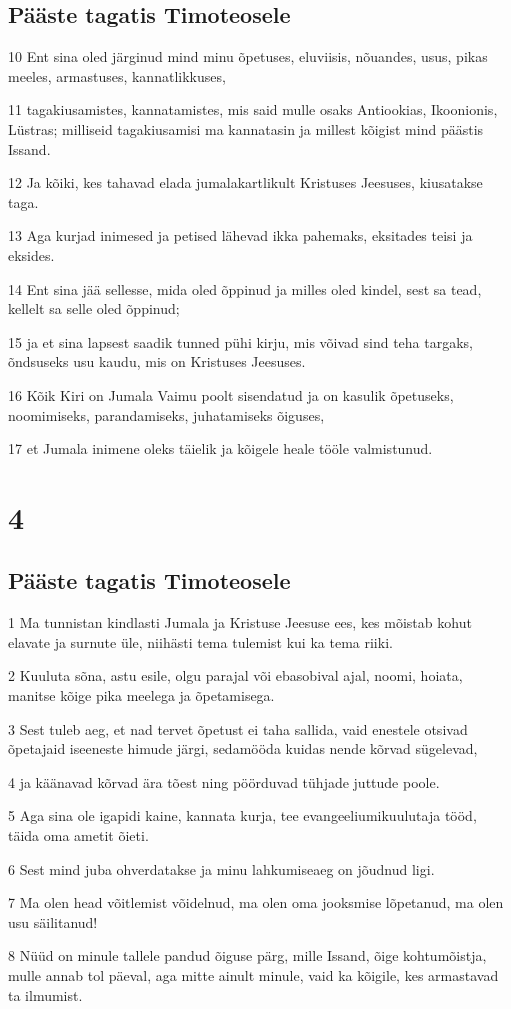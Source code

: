\section*{Pääste tagatis Timoteosele}

\par 10 Ent sina oled järginud mind minu õpetuses, eluviisis, nõuandes, usus, pikas meeles, armastuses, kannatlikkuses,
\par 11 tagakiusamistes, kannatamistes, mis said mulle osaks Antiookias, Ikoonionis, Lüstras; milliseid tagakiusamisi ma kannatasin ja millest kõigist mind päästis Issand.
\par 12 Ja kõiki, kes tahavad elada jumalakartlikult Kristuses Jeesuses, kiusatakse taga.
\par 13 Aga kurjad inimesed ja petised lähevad ikka pahemaks, eksitades teisi ja eksides.
\par 14 Ent sina jää sellesse, mida oled õppinud ja milles oled kindel, sest sa tead, kellelt sa selle oled õppinud;
\par 15 ja et sina lapsest saadik tunned pühi kirju, mis võivad sind teha targaks, õndsuseks usu kaudu, mis on Kristuses Jeesuses.
\par 16 Kõik Kiri on Jumala Vaimu poolt sisendatud ja on kasulik õpetuseks, noomimiseks, parandamiseks, juhatamiseks õiguses,
\par 17 et Jumala inimene oleks täielik ja kõigele heale tööle valmistunud.


\chapter{4}

\section*{Pääste tagatis Timoteosele}

\par 1 Ma tunnistan kindlasti Jumala ja Kristuse Jeesuse ees, kes mõistab kohut elavate ja surnute üle, niihästi tema tulemist kui ka tema riiki.
\par 2 Kuuluta sõna, astu esile, olgu parajal või ebasobival ajal, noomi, hoiata, manitse kõige pika meelega ja õpetamisega.
\par 3 Sest tuleb aeg, et nad tervet õpetust ei taha sallida, vaid enestele otsivad õpetajaid iseeneste himude järgi, sedamööda kuidas nende kõrvad sügelevad,
\par 4 ja käänavad kõrvad ära tõest ning pöörduvad tühjade juttude poole.
\par 5 Aga sina ole igapidi kaine, kannata kurja, tee evangeeliumikuulutaja tööd, täida oma ametit õieti.
\par 6 Sest mind juba ohverdatakse ja minu lahkumiseaeg on jõudnud ligi.
\par 7 Ma olen head võitlemist võidelnud, ma olen oma jooksmise lõpetanud, ma olen usu säilitanud!
\par 8 Nüüd on minule tallele pandud õiguse pärg, mille Issand, õige kohtumõistja, mulle annab tol päeval, aga mitte ainult minule, vaid ka kõigile, kes armastavad ta ilmumist.

